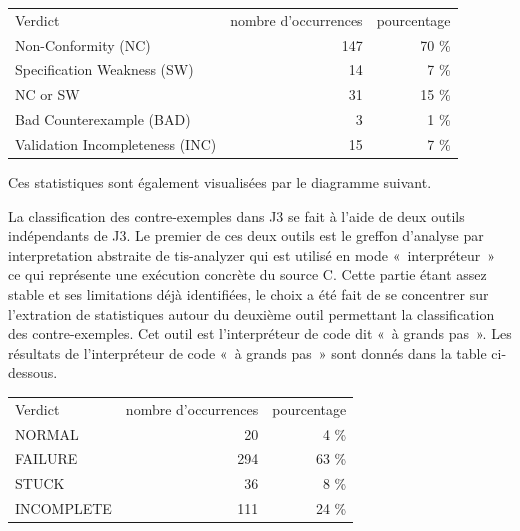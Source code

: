 \documentclass[a4paper,11pt]{article}
\begin{document}
\begin{center}
  \begin{tabular}{|l|r|r|}
    \hline
  \rowcolor{gray!50} Verdict
  & \multicolumn{1}{p{0.13\textwidth}|}{nombre d'occurrences}
  & \multicolumn{1}{p{0.13\textwidth}|}{pourcentage}
  \\
Non-Conformity (NC)                 & 147 & 70 \% \\
Specification Weakness (SW)         &  14 &  7 \% \\
NC or SW  	                        &  31 & 15 \% \\
Bad Counterexample (BAD)            &   3 &  1 \% \\
    Validation Incompleteness (INC) &  15 &  7 \% \\
    \hline
  \end{tabular}
\end{center}
Ces statistiques sont également visualisées par le diagramme
suivant.
  \begin{center}
\end{center}

La classification des contre-exemples dans J3 se fait à l'aide de deux outils
indépendants de J3. Le premier de ces deux outils est le greffon d'analyse par
interpretation abstraite de tis-analyzer qui est utilisé en mode «~interpréteur~»
ce qui représente une exécution concrète du source C. Cette partie étant assez
stable et ses limitations déjà identifiées, le choix a été fait de se concentrer
sur l'extration de statistiques autour du deuxième outil permettant la
classification des contre-exemples. Cet outil est l'interpréteur de code dit
«~à grands pas~». Les résultats de l'interpréteur de code «~à grands pas~»
sont donnés dans la table ci-dessous.

\begin{center}
  \begin{tabular}{|l|r|r|}
    \hline
  \rowcolor{gray!50} Verdict
  & \multicolumn{1}{p{0.13\textwidth}|}{nombre d'occurrences}
  & \multicolumn{1}{p{0.13\textwidth}|}{pourcentage}
  \\
    NORMAL                              &  20 &  4 \% \\
    FAILURE                             & 294 & 63 \% \\
    STUCK                               &  36 &  8 \% \\
    INCOMPLETE                          & 111 & 24 \% \\
    \hline
  \end{tabular}
\end{center}
\end{document}
